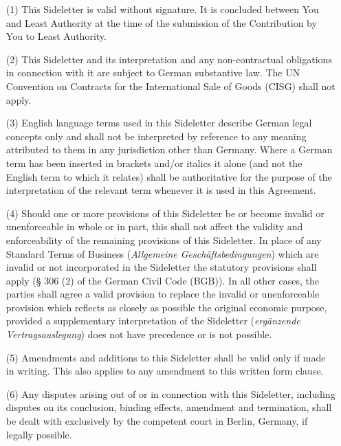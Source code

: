 \begin{itemize}
\item[(1)] This Sideletter is valid without signature. It is concluded between You and Least Authority at the time of the submission of the Contribution by You to Least Authority. 
\item[(2)] This Sideletter and its interpretation and any non-contractual obligations in connection with it are subject to German substantive law. The UN Convention on Contracts for the International Sale of Goods (CISG) shall not apply.
\item[(3)] English language terms used in this Sideletter describe German legal concepts only and shall not be interpreted by reference to any meaning attributed to them in any jurisdiction other than Germany. Where a German term has been inserted in brackets and/or italics it alone (and not the English term to which it relates) shall be authoritative for the purpose of the interpretation of the relevant term whenever it is used in this Agreement.
\item[(4)] Should one or more provisions of this Sideletter be or become invalid or unenforceable in whole or in part, this shall not affect the validity and enforceability of the remaining provisions of this Sideletter. In place of any Standard Terms of Business (\textsl{Allgemeine Geschäftsbedingungen}) which are invalid or not incorporated in the Sideletter the statutory provisions shall apply (§ 306 (2) of the German Civil Code (BGB)). In all other cases, the parties shall agree a valid provision to replace the invalid or unenforceable provision which reflects as closely as possible the original economic purpose, provided a supplementary interpretation of the Sideletter (\textsl{ergänzende Vertragsauslegung}) does not have precedence or is not possible.
\item[(5)] Amendments and additions to this Sideletter shall be valid only if made in writing. This also applies to any amendment to this written form clause. 
\item[(6)] Any disputes arising out of or in connection with this Sideletter, including disputes on its conclusion, binding effects, amendment and termination, shall be dealt with exclusively by the competent court in Berlin, Germany, if legally possible.
\end{itemize}
